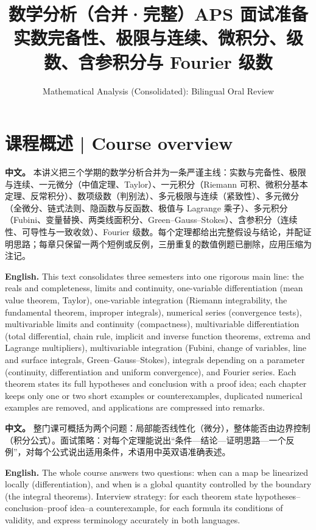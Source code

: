 \documentclass[UTF8,11pt,a4paper]{ctexart}
\title{数学分析（合并·完整）APS 面试准备\\[4pt]\large 实数完备性、极限与连续、微积分、级数、含参积分与 Fourier 级数}
\author{Mathematical Analysis (Consolidated): Bilingual Oral Review}
\date{}
\newcommand{\APS}[2]{\par\noindent\textbf{中文。} #1\par\noindent\textbf{English.} #2\par\smallskip}
\begin{document}
\maketitle

\section*{课程概述 | Course overview}
\APS{本讲义把三个学期的数学分析合并为一条严谨主线：实数与完备性、极限与连续、一元微分（中值定理、Taylor）、一元积分（Riemann 可积、微积分基本定理、反常积分）、数项级数（判别法）、多元极限与连续（紧致性）、多元微分（全微分、链式法则、隐函数与反函数、极值与 Lagrange 乘子）、多元积分（Fubini、变量替换、两类线面积分、Green--Gauss--Stokes）、含参积分（连续性、可导性与一致收敛）、Fourier 级数。每个定理都给出完整假设与结论，并配证明思路；每章只保留一两个短例或反例，三册重复的数值例题已删除，应用压缩为注记。}{This text consolidates three semesters into one rigorous main line: the reals and completeness, limits and continuity, one-variable differentiation (mean value theorem, Taylor), one-variable integration (Riemann integrability, the fundamental theorem, improper integrals), numerical series (convergence tests), multivariable limits and continuity (compactness), multivariable differentiation (total differential, chain rule, implicit and inverse function theorems, extrema and Lagrange multipliers), multivariable integration (Fubini, change of variables, line and surface integrals, Green--Gauss--Stokes), integrals depending on a parameter (continuity, differentiation and uniform convergence), and Fourier series. Each theorem states its full hypotheses and conclusion with a proof idea; each chapter keeps only one or two short examples or counterexamples, duplicated numerical examples are removed, and applications are compressed into remarks.}
\APS{整门课可概括为两个问题：局部能否线性化（微分），整体能否由边界控制（积分公式）。面试策略：对每个定理能说出“条件—结论—证明思路—一个反例”，对每个公式说出适用条件，术语用中英双语准确表述。}{The whole course answers two questions: when can a map be linearized locally (differentiation), and when is a global quantity controlled by the boundary (the integral theorems). Interview strategy: for each theorem state hypotheses--conclusion--proof idea--a counterexample, for each formula its conditions of validity, and express terminology accurately in both languages.}
\end{document}
